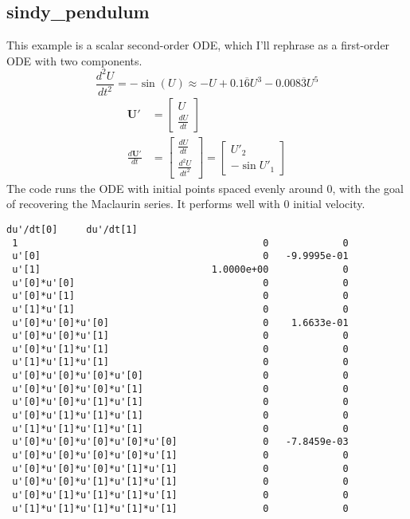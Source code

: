 \documentclass{article}
\let\vec\mathbf
\begin{document}
\subsection{sindy\_pendulum}
This example is a scalar second-order ODE, which I'll rephrase as a first-order ODE with two components.
\begin{equation*}
\frac{d^2U}{dt^2} = -\sin(U) \approx -U + 0.1\overline{6}U^3 - 0.008\overline{3}U^5
\end{equation*}
\begin{align*}
\vec{U}' &=
\begin{bmatrix}
U \\ \frac{dU}{dt}
\end{bmatrix} \\
\frac{d\vec{U}'}{dt} &=
\begin{bmatrix}
\frac{dU}{dt} \\ \frac{d^2U}{dt^2}
\end{bmatrix} =
\begin{bmatrix}
U'_2 \\ -\sin U'_1
\end{bmatrix}
\end{align*}
The code runs the ODE with initial points spaced evenly around 0, with the goal of
recovering the Maclaurin series. It performs well with 0 initial velocity.
\begin{lstlisting}[language={}]
                                    du'/dt[0]     du'/dt[1]
 1                                           0             0
 u'[0]                                       0   -9.9995e-01
 u'[1]                              1.0000e+00             0
 u'[0]*u'[0]                                 0             0
 u'[0]*u'[1]                                 0             0
 u'[1]*u'[1]                                 0             0
 u'[0]*u'[0]*u'[0]                           0    1.6633e-01
 u'[0]*u'[0]*u'[1]                           0             0
 u'[0]*u'[1]*u'[1]                           0             0
 u'[1]*u'[1]*u'[1]                           0             0
 u'[0]*u'[0]*u'[0]*u'[0]                     0             0
 u'[0]*u'[0]*u'[0]*u'[1]                     0             0
 u'[0]*u'[0]*u'[1]*u'[1]                     0             0
 u'[0]*u'[1]*u'[1]*u'[1]                     0             0
 u'[1]*u'[1]*u'[1]*u'[1]                     0             0
 u'[0]*u'[0]*u'[0]*u'[0]*u'[0]               0   -7.8459e-03
 u'[0]*u'[0]*u'[0]*u'[0]*u'[1]               0             0
 u'[0]*u'[0]*u'[0]*u'[1]*u'[1]               0             0
 u'[0]*u'[0]*u'[1]*u'[1]*u'[1]               0             0
 u'[0]*u'[1]*u'[1]*u'[1]*u'[1]               0             0
 u'[1]*u'[1]*u'[1]*u'[1]*u'[1]               0             0
\end{lstlisting}
\end{document}
